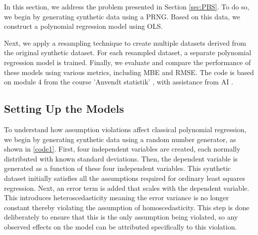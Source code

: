 


In this section, we address the problem presented in Section \ref{sec:PBS}. To do so, we begin by generating synthetic data using a PRNG. Based on this data, we construct a polynomial regression model using OLS.

\noindent Next, we apply a resampling technique to create multiple datasets derived from the original synthetic dataset. For each resampled dataset, a separate polynomial regression model is trained. Finally, we evaluate and compare the performance of these models using various metrics, including MBE and RMSE. The code is based on module 4 from the course 'Anvendt statistik' \cite{ASTA}, with assistance from AI \cite{AI}.

\subsection{Setting Up the Models}
To understand how assumption violations affect classical polynomial regression, we begin by generating synthetic data using a random number generator, as shown in \autoref{code1}. First, four independent variables are created, each normally distributed with known standard deviations. Then, the dependent variable is generated as a function of these four independent variables. This synthetic dataset initially satisfies all the assumptions required for ordinary least squares regression. Next, an error term is added that scales with the dependent variable. This introduces heteroscedasticity meaning the error variance is no longer constant thereby violating the assumption of homoscedasticity. This step is done deliberately to ensure that this is the only assumption being violated, so any observed effects on the model can be attributed specifically to this violation.
\\\\



